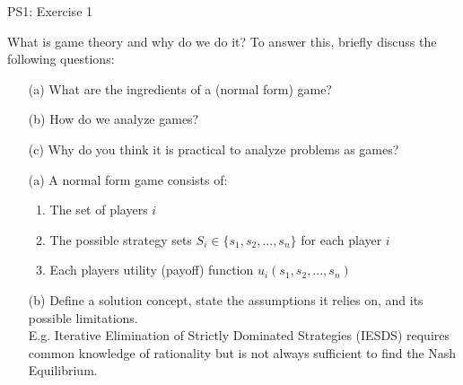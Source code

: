 \begin{frame}{PS1: Exercise 1}
\begin{multicols}{2}
What is game theory and why do we do it? To answer this, briefly discuss the following questions:
\begin{itemize}
  \item[(a)] What are the ingredients of a (normal form) game?
  \item[(b)] How do we analyze games?
  \item[(c)] Why do you think it is practical to analyze problems as games?
\end{itemize}
\vfill\null \columnbreak
\begin{itemize}
  \item[(a)] A normal form game consists of:
    \begin{enumerate}
      \item The set of players $i$
      \item The possible strategy sets $S_i\in \{s_1,s_2,...,s_n\}$ for each player $i$
      \item Each players utility (payoff) function $u_i(s_1,s_2,...,s_n)$
    \end{enumerate}
  \item[(b)] Define a solution concept, state the assumptions it relies on, and its possible limitations.\\
  E.g. Iterative Elimination of Strictly Dominated Strategies (IESDS) requires common knowledge of rationality but is not always sufficient to find the Nash Equilibrium.
\end{itemize}
\vfill\null
\end{multicols}
\end{frame}

